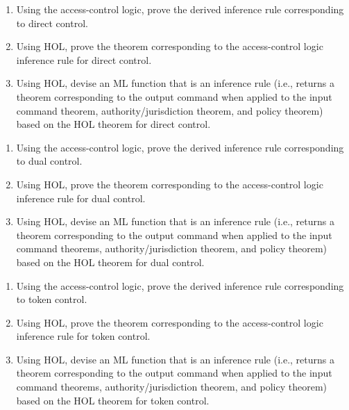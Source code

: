 \begin{exercise}[\synthesis]
\label{exercise:direct}
  \begin{enumerate}[{A.}]
  \item Using the access-control logic, prove the derived inference
    rule corresponding to direct control.
  \item Using HOL, prove the theorem corresponding to the
    access-control logic inference rule for direct control.
  \item Using HOL, devise an ML function that is an inference rule
    (i.e., returns a theorem corresponding to the output command when
    applied to the input command theorem, authority/jurisdiction
    theorem, and policy theorem) based on the HOL theorem for direct
    control.
  \end{enumerate}
\end{exercise}

\begin{exercise}[\synthesis]
  \begin{enumerate}[{A.}]
  \item Using the access-control logic, prove the derived inference
    rule corresponding to dual control.
  \item Using HOL, prove the theorem corresponding to the
    access-control logic inference rule for dual control.
  \item Using HOL, devise an ML function that is an inference rule
    (i.e., returns a theorem corresponding to the output command when
    applied to the input command theorems, authority/jurisdiction
    theorem, and policy theorem) based on the HOL theorem for dual
    control.
  \end{enumerate}
\end{exercise}

\begin{exercise}[\synthesis]
  \begin{enumerate}[{A.}]
  \item Using the access-control logic, prove the derived inference
    rule corresponding to token control.
  \item Using HOL, prove the theorem corresponding to the
    access-control logic inference rule for token control.
  \item Using HOL, devise an ML function that is an inference rule
    (i.e., returns a theorem corresponding to the output command when
    applied to the input command theorems, authority/jurisdiction
    theorem, and policy theorem) based on the HOL theorem for token
    control.
  \end{enumerate}
\end{exercise}

